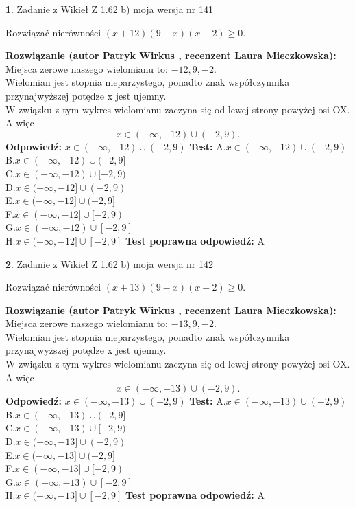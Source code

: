 \documentclass[12pt, a4paper]{article}
\theoremstyle{definition} %
\newtheorem{zad}{}
\newcommand{\zadStart}[1]{\begin{zad}#1\newline}
\newcommand{\zadStop}{\end{zad}}
\newcommand{\rozwStart}[2]{\noindent \textbf{Rozwiązanie (autor #1 , recenzent #2): }\newline}
\newcommand{\rozwStop}{\newline}
\newcommand{\odpStart}{\noindent \textbf{Odpowiedź:}\newline}
\newcommand{\odpStop}{\newline}
\newcommand{\testStart}{\noindent \textbf{Test:}\newline}
\newcommand{\testStop}{\newline}
\newcommand{\kluczStart}{\noindent \textbf{Test poprawna odpowiedź:}\newline}
\newcommand{\kluczStop}{\newline}
\begin{document}
\zadStart{Zadanie z Wikieł Z 1.62 b) moja wersja nr 141}

Rozwiązać nierówności $(x+12)(9-x)(x+2)\ge0$.
\zadStop
\rozwStart{Patryk Wirkus}{Laura Mieczkowska}
Miejsca zerowe naszego wielomianu to: $-12, 9, -2$.\\
Wielomian jest stopnia nieparzystego, ponadto znak współczynnika przy\linebreak najwyższej potędze x jest ujemny.\\ W związku z tym wykres wielomianu zaczyna się od lewej strony powyżej osi OX. A więc $$x \in (-\infty,-12) \cup (-2,9).$$
\rozwStop
\odpStart
$x \in (-\infty,-12) \cup (-2,9)$
\odpStop
\testStart
A.$x \in (-\infty,-12) \cup (-2,9)$\\
B.$x \in (-\infty,-12) \cup (-2,9]$\\
C.$x \in (-\infty,-12) \cup [-2,9)$\\
D.$x \in (-\infty,-12] \cup (-2,9)$\\
E.$x \in (-\infty,-12] \cup (-2,9]$\\
F.$x \in (-\infty,-12] \cup [-2,9)$\\
G.$x \in (-\infty,-12) \cup [-2,9]$\\
H.$x \in (-\infty,-12] \cup [-2,9]$
\testStop
\kluczStart
A
\kluczStop



\zadStart{Zadanie z Wikieł Z 1.62 b) moja wersja nr 142}

Rozwiązać nierówności $(x+13)(9-x)(x+2)\ge0$.
\zadStop
\rozwStart{Patryk Wirkus}{Laura Mieczkowska}
Miejsca zerowe naszego wielomianu to: $-13, 9, -2$.\\
Wielomian jest stopnia nieparzystego, ponadto znak współczynnika przy\linebreak najwyższej potędze x jest ujemny.\\ W związku z tym wykres wielomianu zaczyna się od lewej strony powyżej osi OX. A więc $$x \in (-\infty,-13) \cup (-2,9).$$
\rozwStop
\odpStart
$x \in (-\infty,-13) \cup (-2,9)$
\odpStop
\testStart
A.$x \in (-\infty,-13) \cup (-2,9)$\\
B.$x \in (-\infty,-13) \cup (-2,9]$\\
C.$x \in (-\infty,-13) \cup [-2,9)$\\
D.$x \in (-\infty,-13] \cup (-2,9)$\\
E.$x \in (-\infty,-13] \cup (-2,9]$\\
F.$x \in (-\infty,-13] \cup [-2,9)$\\
G.$x \in (-\infty,-13) \cup [-2,9]$\\
H.$x \in (-\infty,-13] \cup [-2,9]$
\testStop
\kluczStart
A
\kluczStop
\end{document}
